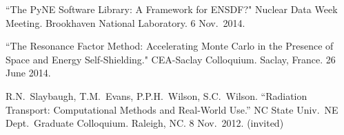 \begin{bibsection}




\item ``The PyNE Software Library: A Framework for ENSDF?" Nuclear Data Week Meeting. Brookhaven National Laboratory. 6 Nov.\ 2014. 



\item ``The Resonance Factor Method: Accelerating Monte Carlo in the Presence of Space and Energy Self-Shielding." CEA-Saclay Colloquium. Saclay, France. 26 June 2014.



\item R.N.\ Slaybaugh, T.M.\ Evans, P.P.H.\ Wilson, S.C.\ Wilson. ``Radiation Transport: Computational Methods and Real-World Use.'' NC State Univ.\ NE Dept.\ Graduate Colloquium. Raleigh, NC. 8 Nov.\ 2012. (invited)


\end{bibsection}
